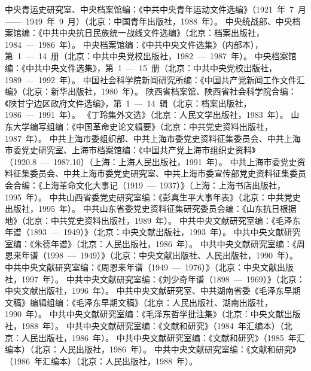 
\begin{thebibliography}{999}
\bibitem{}中央青运史研究室、中央档案馆编：《中共中央青年运动文件选编》（1921~年~7~月——~1949~年~9~月）（北京：中国青年出版社，1988~年）。
\bibitem{}中央统战部、中央档案馆编：《中共中央抗日民族统一战线文件选编》（北京：档案出版社，1984~—~1986~年）。
\bibitem{}中央档案馆编：《中共中央文件选集》（内部本），第~1~—~14~册（北京：中共中央党校出版社，1982~—~1987~年）。
\bibitem{}中央档案馆编：《中共中央文件选集》，第~1~—~15~册（北京：中共中央党校出版社，1989~—~1992~年）。
\bibitem{}中国社会科学院新闻研究所编：《中国共产党新闻工作文件汇编》（北京：新华出版社，1980~年）。
\bibitem{}陕西省档案馆、陕西省社会科学院合编：《陕甘宁边区政府文件选编》，第~1~—~14~辑（北京：档案出版社，1986~—~1991~年）。
\bibitem{}《丁玲集外文选》（北京：人民文学出版社，1983~年）。
\bibitem{}山东大学编写组编：《中国革命史论文辑要》（北京：中共党史资料出版社，1987~年）。
\bibitem{}中共上海市委组织部、中共上海市委党史资料征集委员会、中共上海市委党史研究室、上海市档案馆编：《中国共产党上海市组织史资料》（1920.8~—~1987.10）（上海：上海人民出版社，1991~年）。
\bibitem{}中共上海市委党史资料征集委员会、中共上海市委党史研究室、中共上海市委宣传部党史资料征集委员会合编：《上海革命文化大事记（1919~—~1937）》（上海：上海书店出版社，1995~年）。
\bibitem{}中共山西省委党史研究室编：《彭真生平大事年表》（北京：中共党史出版社，1995~年）。
\bibitem{}中共山东省委党史资料征集研究委员会编：《山东抗日根据地》（北京：中共党史资料出版社，1989~年）。
\bibitem{}中共中央文献研究室编：《毛泽东年谱（1893~—~1949）》（北京：中央文献出版社，1993~年）。
\bibitem{}中共中央文献研究室编：《朱德年谱》（北京：人民出版社，1986~年）。
\bibitem{}中共中央文献研究室编：《周恩来年谱（1998~—~1949）》（北京：中央文献出版社、人民出版社，1990~年）。
\bibitem{}中共中央文献研究室编：《周恩来年谱（1949~—~1976）》（北京：中央文献出版社，1997~年）。
\bibitem{}中共中央文献研究室编：《刘少奇年谱（1898~—~1969）》（北京：中央文献出版社，1996~年）。
\bibitem{}中共中央文献研究室、中共湖南省委《毛泽东早期文稿》编辑组编：《毛泽东早期文稿》（北京：人民出版社、湖南出版社，1990~年）。
\bibitem{}中共中央文献研究室编：《毛泽东哲学批注集》（北京：中央文献出版社，1988~年）。
\bibitem{}中共中央文献研究室编：《文献和研究》（1984~年汇编本）（北京：人民出版社，1986~年）。
\bibitem{}中共中央文献研究室编：《文献和研究》（1985~年汇编本）（北京：人民出版社，1986~年）。
\bibitem{}中共中央文献研究室编：《文献和研究》（1986~年汇编本）（北京：人民出版社，1988~年）。

\end{thebibliography}
